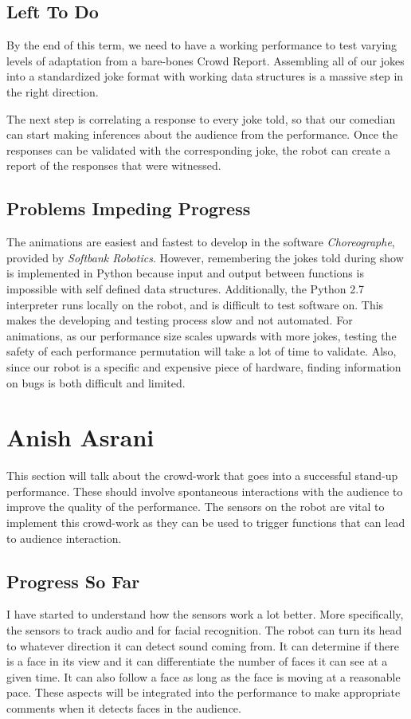 \documentclass[onecolumn, draftclsnofoot,10pt, compsoc]{IEEEtran}
\begin{document}
\subsection{Left To Do}
By the end of this term, we need to have a working performance to test varying levels of adaptation from a bare-bones Crowd Report. Assembling all of our jokes into a standardized joke format with working data structures is a massive step in the right direction.

The next step is correlating a response to every joke told, so that our comedian can start making inferences about the audience from the performance. Once the responses can be validated with the corresponding joke, the robot can create a report of the responses that were witnessed.

\subsection{Problems Impeding Progress}
The animations are easiest and fastest to develop in the software \textit{Choreographe}, provided by \textit{Softbank Robotics}. However, remembering the jokes told during show is implemented in Python because input and output between functions is impossible with self defined data structures. Additionally, the Python 2.7 interpreter runs locally on the robot, and is difficult to test software on. This makes the developing and testing process slow and not automated.
For animations, as our performance size scales upwards with more jokes, testing the safety of each performance permutation will take a lot of time to validate. Also, since our robot is a specific and expensive piece of hardware, finding information on bugs is both difficult and limited.





\section{Anish Asrani}

This section will talk about the crowd-work that goes into a successful stand-up performance. These should involve spontaneous interactions with the audience to improve the quality of the performance. The sensors on the robot are vital to implement this crowd-work as they can be used to trigger functions that can lead to audience interaction.

\subsection{Progress So Far}
I have started to understand how the sensors work a lot better. More specifically, the sensors to track audio and for facial recognition. The robot can turn its head to whatever direction it can detect sound coming from. It can determine if there is a face in its view and it can differentiate the number of faces it can see at a given time. It can also follow a face as long as the face is moving at a reasonable pace. These aspects will be integrated into the performance to make appropriate comments when it detects faces in the audience.
\end{document}
